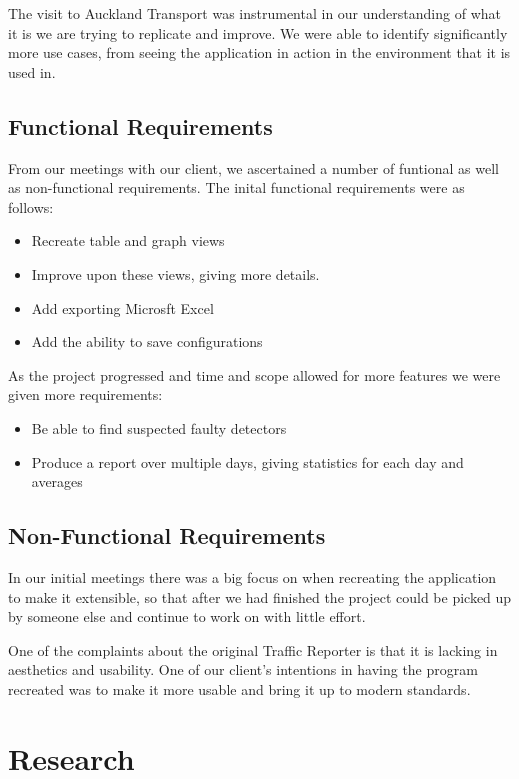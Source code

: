 \documentclass{article}
\begin{document}
The visit to Auckland Transport was instrumental in our
understanding of what it is we are trying to replicate and
improve. We were able to identify significantly more use
cases, from seeing the application in action in the environment
that it is used in.

\subsection{Functional Requirements}
From our meetings with our client, we ascertained a number of funtional as well as non-functional requirements. The inital functional requirements were as follows:

\begin{itemize}
	\item Recreate table and graph views
	\item Improve upon these views, giving more details.
	\item Add exporting Microsft Excel
	\item Add the ability to save configurations
\end{itemize}

As the project progressed and time and scope allowed for more features we were given more requirements:

\begin{itemize}
	\item Be able to find suspected faulty detectors
	\item Produce a report over multiple days, giving statistics for each day and averages
\end{itemize}

\subsection{Non-Functional Requirements}

In our initial meetings there was a big focus on when recreating the application to make it extensible, so that after we had finished the project could be picked up by someone else and continue to work on with little effort.

One of the complaints about the original Traffic Reporter is that it is lacking in aesthetics and usability. One of our client's intentions in having the program recreated was to make it more usable and bring it up to modern standards.

\section{Research}
\end{document}
